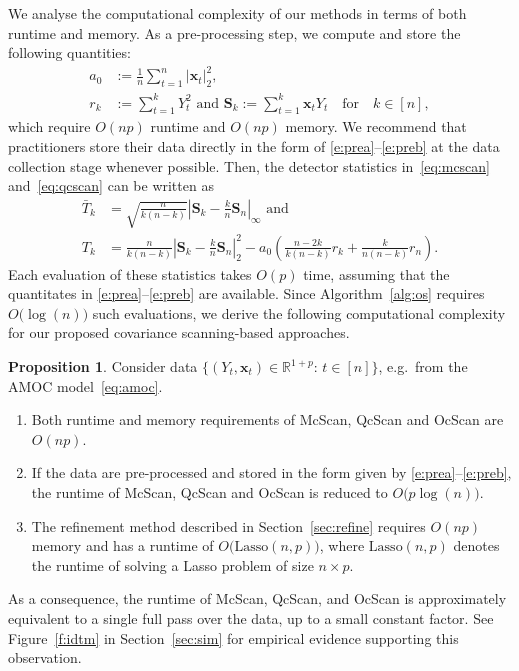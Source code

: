 \documentclass[11pt, a4paper]{article}
\newcommand{\mbf}{\mathbf}
\renewcommand{\l}{\left}
\renewcommand{\r}{\right}
\newcommand{\R}{\mathbb{R}}
\theoremstyle{definition}
\theoremstyle{definition}
\theoremstyle{definition}
\theoremstyle{definition}
\newtheorem{prop}[thm]{Proposition}
\theoremstyle{definition}
\theoremstyle{remark}
\theoremstyle{definition}
\theoremstyle{definition}
\theoremstyle{definition}
\begin{document}
We analyse the computational complexity of our methods in terms of both runtime and memory. As a pre-processing step, we compute and store the following quantities:
\begin{subequations}
\begin{align}
a_0 & :=\frac{1}{n} \sum_{t = 1}^n\vert\mbf x_t \vert_2^2, \label{e:prea}\\
r_k & := \sum_{t = 1}^k Y_t^2 \text{ \ and \ } {\bm S}_k := \sum_{t = 1}^k \mbf x_t Y_t \quad \text{for}\quad k \in [n], \label{e:preb}
\end{align}
\end{subequations}
which require $O(np)$ runtime and $O(np)$ memory. 
We recommend that practitioners store their data directly in the form of \eqref{e:prea}--\eqref{e:preb} at the data collection stage whenever possible.
Then, the detector statistics in~\eqref{eq:mcscan} and~\eqref{eq:qcscan} can be written as 
\begin{align*}
\bar{T}_k & =  \sqrt{\frac{n}{k(n-k)}}\l\vert\bm S_k - \frac{k}{n}\bm S_n\r\vert_\infty \text{ and} \\
T_k & = \frac{n}{k(n-k)}\l\vert\bm S_k - \frac{k}{n}\bm S_n\r\vert_2^2 - a_0 \l(\frac{n-2k}{k(n-k)}r_k +\frac{k}{n(n-k)}r_n\r).
\end{align*}
Each evaluation of these statistics takes $O(p)$ time, assuming that the quantitates in \eqref{e:prea}--\eqref{e:preb} are available. Since Algorithm~\ref{alg:os} requires $O\bigl(\log (n)\bigr)$ such evaluations, we derive the following computational complexity for our proposed covariance scanning-based approaches.
\begin{prop}
Consider data $\{(Y_t, \mbf x_t) \in \R^{1+p} : \, t \in [n]\}$, e.g.\ from the AMOC model~\eqref{eq:amoc}. 
\begin{enumerate}[label = (\roman*)]
\item Both runtime and memory requirements of McScan, QcScan and OcScan are $O(np)$. 
\item If the data are pre-processed and stored in the form given by \eqref{e:prea}--\eqref{e:preb}, the runtime of McScan, QcScan and OcScan is reduced to $O\bigl(p \log(n) \bigr)$.
\item The refinement method described in Section~\ref{sec:refine} requires $O(np)$ memory and has a runtime of $O\bigl(\mathrm{Lasso}(n, p)\bigr)$, where $\mathrm{Lasso}(n, p)$ denotes the runtime of solving a Lasso problem of size $n \times p$.
\end{enumerate}
\end{prop}
As a consequence, the runtime of McScan, QcScan, and OcScan is approximately equivalent to a single full pass over the data, up to a small constant factor. See Figure~\ref{f:idtm} in Section~\ref{sec:sim} for empirical evidence supporting this observation.
\end{document}
